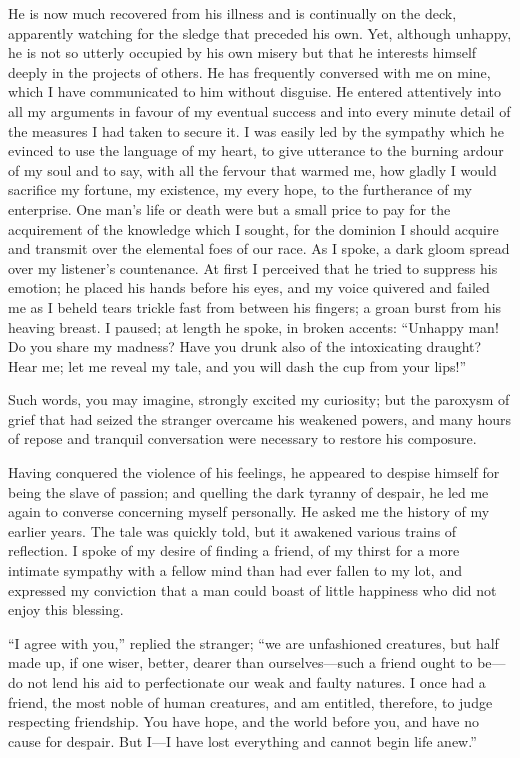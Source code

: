 \documentclass[12pt,openright]{book}
\begin{document}
He is now much recovered from his illness and is continually on the deck, apparently watching for the sledge that preceded his own. Yet, although unhappy, he is not so utterly occupied by his own misery but that he interests himself deeply in the projects of others. He has frequently conversed with me on mine, which I have communicated to him without disguise. He entered attentively into all my arguments in favour of my eventual success and into every minute detail of the measures I had taken to secure it. I was easily led by the sympathy which he evinced to use the language of my heart, to give utterance to the burning ardour of my soul and to say, with all the fervour that warmed me, how gladly I would sacrifice my fortune, my existence, my every hope, to the furtherance of my enterprise. One man’s life or death were but a small price to pay for the acquirement of the knowledge which I sought, for the dominion I should acquire and transmit over the elemental foes of our race. As I spoke, a dark gloom spread over my listener’s countenance. At first I perceived that he tried to suppress his emotion; he placed his hands before his eyes, and my voice quivered and failed me as I beheld tears trickle fast from between his fingers; a groan burst from his heaving breast. I paused; at length he spoke, in broken accents: “Unhappy man! Do you share my madness? Have you drunk also of the intoxicating draught? Hear me; let me reveal my tale, and you will dash the cup from your lips!”

Such words, you may imagine, strongly excited my curiosity; but the paroxysm of grief that had seized the stranger overcame his weakened powers, and many hours of repose and tranquil conversation were necessary to restore his composure.

Having conquered the violence of his feelings, he appeared to despise himself for being the slave of passion; and quelling the dark tyranny of despair, he led me again to converse concerning myself personally. He asked me the history of my earlier years. The tale was quickly told, but it awakened various trains of reflection. I spoke of my desire of finding a friend, of my thirst for a more intimate sympathy with a fellow mind than had ever fallen to my lot, and expressed my conviction that a man could boast of little happiness who did not enjoy this blessing.

“I agree with you,” replied the stranger; “we are unfashioned creatures, but half made up, if one wiser, better, dearer than ourselves—such a friend ought to be—do not lend his aid to perfectionate our weak and faulty natures. I once had a friend, the most noble of human creatures, and am entitled, therefore, to judge respecting friendship. You have hope, and the world before you, and have no cause for despair. But I—I have lost everything and cannot begin life anew.”
\end{document}
